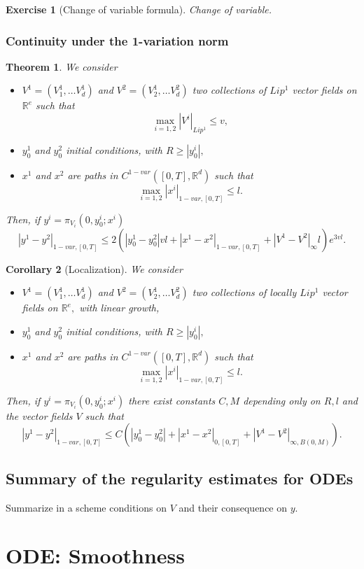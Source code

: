 \documentclass{article}
\newcommand{\R}{\mathbb{R}}
\newtheorem{theorem}{Theorem}
\newtheorem{exercise}{Exercise}
\newtheorem{corollary}[theorem]{Corollary}
\begin{document}
\begin{exercise}[Change of variable formula]
    Change of variable.
\end{exercise}

\subsubsection{Continuity under the 1-variation norm}

\begin{theorem}
    We consider
    \begin{itemize}
        \item $V^1 = (V_1^1, \ldots V^1_d)$ and $V^2 = (V_2^1, \ldots V^2_d)$ two collections of $Lip^1$ vector fields on $\R^e$ such that
        \begin{equation}
            \max_{i=1,2} |V^i|_{Lip^1} \leq v,
        \end{equation}
        \item $y_0^1$ and $y_0^2$ initial conditions, with $R \geq |y_0^i|,$
        \item $x^1$ and $x^2$ are paths in $C^{1-var}([0,T], \R^d)$ such that 
        \begin{equation}
            \max_{i=1,2} |x^i|_{1-var, [0,T]} \leq l.
        \end{equation} 
    \end{itemize}

    Then, if $y^i = \pi_{V_i}(0, y_0^i; x^i)$
    \begin{equation}
        |y^1 - y^2|_{1-var,[0,T]} \leq 2 \left( |y_0^1 - y_0^2| v l + |x^1 - x^2|_{1-var,[0,T]} + |V^1 - V^2|_\infty l \right) e^{3vl}.
    \end{equation}
\end{theorem}

\begin{corollary}[Localization]
        We consider
    \begin{itemize}
        \item $V^1 = (V_1^1, \ldots V^1_d)$ and $V^2 = (V_2^1, \ldots V^2_d)$ two collections of locally $Lip^1$ vector fields on $\R^e,$ with linear growth,
        \item $y_0^1$ and $y_0^2$ initial conditions, with $R \geq |y_0^i|,$
        \item $x^1$ and $x^2$ are paths in $C^{1-var}([0,T], \R^d)$ such that 
        \begin{equation}
            \max_{i=1,2} |x^i|_{1-var, [0,T]} \leq l.
        \end{equation} 
    \end{itemize}

    Then, if $y^i = \pi_{V_i}(0, y_0^i; x^i)$ there exist constants $C, M$ depending only on $R, l$ and the vector fields $V$ such that
    \begin{equation}
        |y^1 - y^2|_{1-var,[0,T]} \leq C \left( |y_0^1 - y_0^2| + |x^1 - x^2|_{0,[0,T]} + |V^1 - V^2|_{\infty, B(0,M)} \right).
    \end{equation}
\end{corollary}

\subsection{Summary of the regularity estimates for ODEs}
Summarize in a scheme conditions on $V$ and their consequence on $y.$
\section{ODE: Smoothness}
\end{document}
